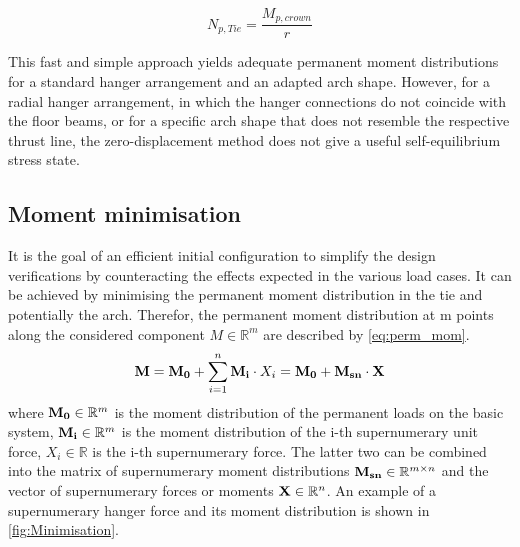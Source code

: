 \begin{equation}
    N_{p,Tie} = \frac{M_{p,crown}}{r}
    \label{eq:M_0}
\end{equation}

This fast and simple approach yields adequate permanent moment distributions for a standard hanger arrangement and an adapted arch shape. However, for a radial hanger arrangement, in which the hanger connections do not coincide with the floor beams, or for a specific arch shape that does not resemble the respective thrust line, the zero-displacement method does not give a useful self-equilibrium stress state.

\subsection{Moment minimisation}
It is the goal of an efficient initial configuration to simplify the design verifications by counteracting the effects expected in the various load cases. It can be achieved by minimising the permanent moment distribution in the tie and potentially the arch. Therefor, the permanent moment distribution at m points along the considered component $M \in \mathbb{R}^m$ are described by \cref{eq:perm_mom}. 
\begin{equation}
    {\bf M} = {\bf M_0} + \sum_{i=1}^{n} {\bf M_i} \cdot X_i = {\bf M_0} + {\bf M_{sn}} \cdot {\bf X}
    \label{eq:perm_mom}
\end{equation}
where ${\bf M_0} \in \mathbb{R}^m$ is the moment distribution of the permanent loads on the basic system, ${\bf M_i} \in \mathbb{R}^m$ is the moment distribution of the i-th supernumerary unit force, ${X_i} \in \mathbb{R}$ is the i-th supernumerary force. The latter two can be combined into the matrix of supernumerary moment distributions ${\bf M_{sn}} \in  \mathbb{R}^{m\times n}$ and the vector of supernumerary forces or moments ${\bf X} \in \mathbb{R}^n$. An example of a supernumerary hanger force and its moment distribution is shown in \cref{fig:Minimisation}.

